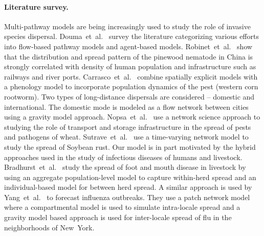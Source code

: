 \documentclass[11pt]{article}
\newcommand{\tuta}{\emph{T.~absoluta}}
\theoremstyle{definition}
\begin{document}
\paragraph{Literature survey.} Multi-pathway models are being increasingly
used to study the role of invasive species dispersal.
Douma~et~al.~\cite{douma2016pathway} survey the literature categorizing
various efforts into flow-based pathway models and agent-based models.
Robinet~et~al.~\cite{robinet2009role} show that the distribution and spread
pattern of the pinewood nematode in China is strongly correlated with
density of human population and infrastructure such as railways and river
ports.  Carrasco~et~al.~\cite{carrasco2010unveiling} combine spatially
explicit models with a phenology model to incorporate population dynamics
of the pest (western corn rootworm). Two types of long-distance dispersals
are considered -- domestic and international. The domestic mode is modeled
as a flow network between cities using a gravity model approach.
Nopsa~et~al.~\cite{nopsa2015ecological} use a network science approach to
studying the role of transport and storage infrastructure in the spread of
pests and pathogens of wheat. Sutrave~et~al.~\cite{sutrave2012identifying}
use a time-varying network model to study the spread of Soybean rust.  Our
model is in part motivated by the hybrid approaches used in the study of
infectious diseases of humans and livestock.
Bradhurst~et~al.~\cite{bradhurst2015hybrid} study the spread of foot and
mouth disease in livestock by using an aggregate population-level model to
capture within-herd spread and an individual-based model for between herd
spread. A similar approach is used by Yang~et~al.~\cite{yang2016} to
forecast influenza outbreaks. They use a patch network model where a
compartmental model is used to simulate intra-locale spread and a gravity
model based approach is used for inter-locale spread of flu in the
neighborhoods of New~York.

\end{document}
